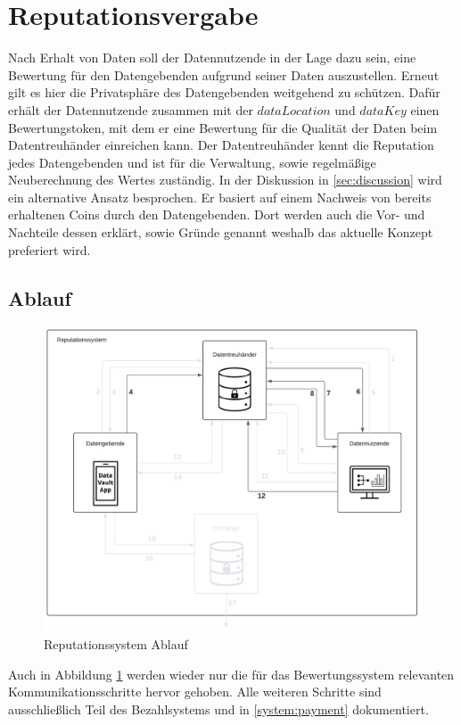 \documentclass{scrreprt}
\begin{document}
\section{Reputationsvergabe}
Nach Erhalt von Daten soll der Datennutzende in der Lage dazu sein, eine Bewertung für den Datengebenden aufgrund seiner Daten auszustellen. Erneut gilt es hier die Privatsphäre des Datengebenden weitgehend zu schützen. Dafür erhält der Datennutzende zusammen mit der $dataLocation$ und $dataKey$ einen Bewertungstoken, mit dem er eine Bewertung für die Qualität der Daten beim Datentreuhänder einreichen kann. Der Datentreuhänder kennt die Reputation jedes Datengebenden und ist für die Verwaltung, sowie regelmäßige Neuberechnung des Wertes zuständig.
In der Diskussion in \ref{sec:discussion} wird ein alternative Ansatz besprochen. Er basiert auf einem Nachweis von bereits erhaltenen Coins durch den Datengebenden. Dort werden auch die Vor- und Nachteile dessen erklärt, sowie Gründe genannt weshalb das aktuelle Konzept preferiert wird.
\label{system:reputation}
\subsection{Ablauf}
\begin{figure}[H]
    \centering
    \includegraphics[width=0.9\linewidth]{ReputationDiagramm.pdf}
    \caption{Reputationssystem Ablauf}
    \label{fig:reputation}
\end{figure}

Auch in Abbildung \ref{fig:reputation} werden wieder nur die für das Bewertungssystem relevanten Kommunikationsschritte hervor gehoben. Alle weiteren Schritte sind ausschließlich Teil des Bezahlsystems und in \ref{system:payment} dokumentiert.
\end{document}
